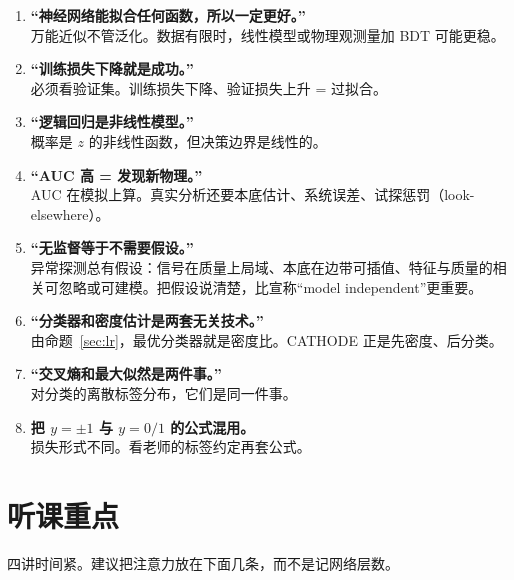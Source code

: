 \documentclass[11pt,a4paper]{article}
\theoremstyle{definition}
\theoremstyle{plain}
\theoremstyle{remark}
\begin{document}
\begin{enumerate}[leftmargin=1.8em]
  \item \textbf{``神经网络能拟合任何函数，所以一定更好。''}\\
  万能近似不管泛化。数据有限时，线性模型或物理观测量加 BDT 可能更稳。

  \item \textbf{``训练损失下降就是成功。''}\\
  必须看验证集。训练损失下降、验证损失上升 = 过拟合。

  \item \textbf{``逻辑回归是非线性模型。''}\\
  概率是 $z$ 的非线性函数，但决策边界是线性的。

  \item \textbf{``AUC 高 = 发现新物理。''}\\
  AUC 在模拟上算。真实分析还要本底估计、系统误差、试探惩罚（look-elsewhere）。

  \item \textbf{``无监督等于不需要假设。''}\\
  异常探测总有假设：信号在质量上局域、本底在边带可插值、特征与质量的相关可忽略或可建模。把假设说清楚，比宣称``model independent''更重要。

  \item \textbf{``分类器和密度估计是两套无关技术。''}\\
  由命题~\ref{sec:lr}，最优分类器就是密度比。CATHODE 正是先密度、后分类。

  \item \textbf{``交叉熵和最大似然是两件事。''}\\
  对分类的离散标签分布，它们是同一件事。

  \item \textbf{把 $y=\pm1$ 与 $y=0/1$ 的公式混用。}\\
  损失形式不同。看老师的标签约定再套公式。
\end{enumerate}

\section{听课重点}
\label{sec:listen}

四讲时间紧。建议把注意力放在下面几条，而不是记网络层数。
\end{document}
